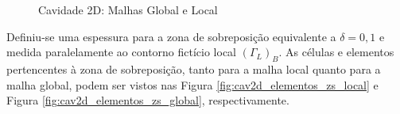 \begin{figure}[!htbp]
	\caption{Cavidade 2D: Malhas Global e Local}
	\centering
	\label{fig:cav2d_discretização}
\end{figure}

Definiu-se uma espessura para a zona de sobreposição equivalente a $\delta = 0,1$ e medida paralelamente ao contorno fictício local $(\Gamma_{L})_{B}$. As células e elementos pertencentes à zona de sobreposição, tanto para a malha local quanto para a malha global, podem ser vistos nas Figura \ref{fig:cav2d_elementos_zs_local} e Figura \ref{fig:cav2d_elementos_zs_global}, respectivamente.

